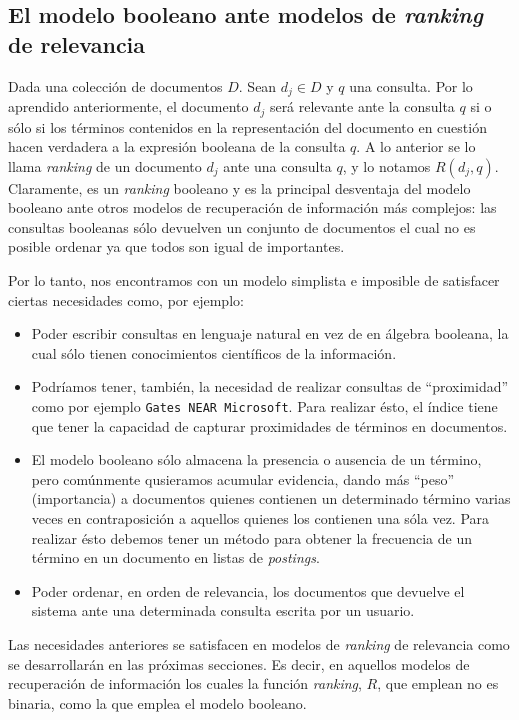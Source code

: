 		\subsection{El modelo booleano ante modelos de \textit{ranking} de relevancia}
			Dada una colección de documentos $D$. Sean $d_j \in D$ y $q$ una consulta. Por lo aprendido anteriormente, el documento $d_j$ será relevante ante la consulta $q$ si o sólo si los términos contenidos en la representación del documento en cuestión hacen verdadera a la expresión booleana de la consulta $q$. A lo anterior se lo llama \textit{ranking} de un documento $d_j$ ante una consulta $q$, y lo notamos $R(d_j,q)$. Claramente, es un \textit{ranking} booleano y es la principal desventaja del modelo booleano ante otros modelos de recuperación de información más complejos: las consultas booleanas sólo devuelven un conjunto de documentos el cual no es posible ordenar ya que todos son igual de importantes. \par
			
			Por lo tanto, nos encontramos con un modelo simplista e imposible de satisfacer ciertas necesidades como, por ejemplo:
			\begin{itemize}
				\item Poder escribir consultas en lenguaje natural en vez de en álgebra booleana, la cual sólo tienen conocimientos científicos de la información.
				\item Podríamos tener, también, la necesidad de realizar consultas de \enquote{proximidad} como por ejemplo \texttt{Gates NEAR Microsoft}. Para realizar ésto, el índice tiene que tener la capacidad de capturar proximidades de términos en documentos.
				\item El modelo booleano sólo almacena la presencia o ausencia de un término, pero comúnmente qusieramos acumular evidencia, dando más \enquote{peso} (importancia) a documentos quienes contienen un determinado término varias veces en contraposición a aquellos quienes los contienen una sóla vez. Para realizar ésto debemos tener un método para obtener la frecuencia de un término en un documento en listas de \textit{postings}.
				\item Poder ordenar, en orden de relevancia, los documentos que devuelve el sistema ante una determinada consulta escrita por un usuario.
			\end{itemize}
			
			Las necesidades anteriores se satisfacen en modelos de \textit{ranking} de relevancia como se desarrollarán en las próximas secciones. Es decir, en aquellos modelos de recuperación de información los cuales la función \textit{ranking}, $R$, que emplean no es binaria, como la que emplea el modelo booleano.

